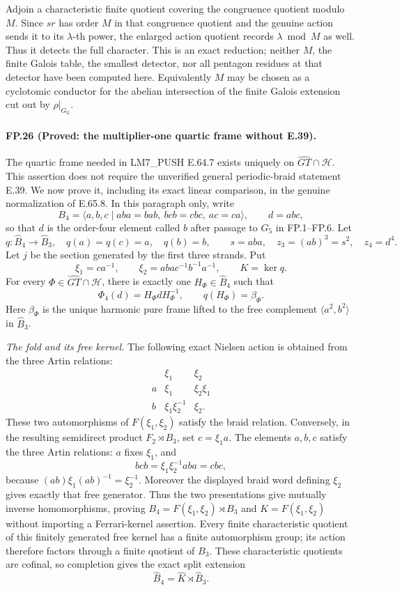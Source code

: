 Adjoin a characteristic finite quotient covering the congruence quotient
modulo $M$. Since $sr$ has order $M$ in that congruence quotient and the
genuine action sends it to its $\lambda$-th power, the enlarged action
quotient records $\lambda\bmod M$ as well. Thus it detects the full
character. This is an exact reduction; neither $M$, the finite Galois
table, the smallest detector, nor all pentagon residues at that detector
have been computed here. Equivalently $M$ may be chosen as a cyclotomic
conductor for the abelian intersection of the finite Galois extension
cut out by $\rho|_{G_{\mathbb Q}}$.

\paragraph{FP.26 (Proved: the multiplier-one quartic frame without E.39).}
The quartic frame needed in LM7\_PUSH E.64.7 exists uniquely on
$\widehat{GT}\cap\mathcal H$. This assertion does not require the
unverified general periodic-braid statement E.39. We now prove it,
including its exact linear comparison, in the genuine normalization of
E.65.8. In this paragraph only, write
\[
 B_4=\langle a,b,c\mid aba=bab,\ bcb=cbc,\ ac=ca\rangle,
 \qquad d=abc,
\]
so that $d$ is the order-four element called $b$ after passage to $G_5$
in FP.1--FP.6. Let
\[
 q:\widehat B_4\longrightarrow\widehat B_3,
 \quad q(a)=q(c)=a,\quad q(b)=b,\qquad
 s=aba,\quad z_3=(ab)^3=s^2,\quad z_4=d^4.
\]
Let $j$ be the section generated by the first three strands. Put
\[
 \xi_1=ca^{-1},\qquad
 \xi_2=aba c^{-1}b^{-1}a^{-1},\qquad K=\ker q.
\]
For every $\Phi\in\widehat{GT}\cap\mathcal H$, there is exactly one
$H_\Phi\in\widehat B_4$ such that
\[
 \Phi_4(d)=H_\Phi dH_\Phi^{-1},\qquad q(H_\Phi)=\beta_\Phi.
 \tag{FP.26.1}
\]
Here $\beta_\Phi$ is the unique harmonic pure frame lifted to the free
complement $\langle a^2,b^2\rangle$ in $\widehat B_3$.

\emph{The fold and its free kernel.}
The following exact Nielsen action is obtained from the three Artin
relations:
\[
 \begin{array}{c|cc}
 &\xi_1&\xi_2\\ \hline
 a&\xi_1&\xi_2\xi_1\\
 b&\xi_1\xi_2^{-1}&\xi_2.
 \end{array}
 \tag{FP.26.2}
\]
These two automorphisms of $F(\xi_1,\xi_2)$ satisfy the braid relation.
Conversely, in the resulting semidirect product $F_2\rtimes B_3$, set
$c=\xi_1a$. The elements $a,b,c$ satisfy the three Artin relations:
$a$ fixes $\xi_1$, and
\[
 bcb=\xi_1\xi_2^{-1}aba=cbc,
\]
because $(ab)\xi_1(ab)^{-1}=\xi_2^{-1}$.
Moreover the displayed braid word defining $\xi_2$ gives exactly that
free generator. Thus the two presentations give mutually inverse
homomorphisms, proving $B_4=F(\xi_1,\xi_2)\rtimes B_3$ and
$K=F(\xi_1,\xi_2)$ without importing a Ferrari-kernel assertion.
Every finite characteristic quotient of this finitely generated free
kernel has a finite automorphism group; its action therefore factors
through a finite quotient of $B_3$. These characteristic quotients are
cofinal, so completion gives the exact split extension
\[
 \widehat B_4=\widehat K\rtimes\widehat B_3.
 \tag{FP.26.3}
\]

